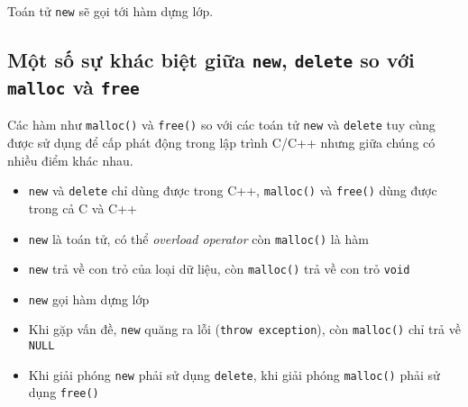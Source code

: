 \documentclass{article}
\begin{document}
Toán tử \texttt{new} sẽ gọi tới hàm dựng lớp.

\subsection{Một số sự khác biệt giữa \texttt{new}, \texttt{delete} so với \texttt{malloc} và \texttt{free}}

Các hàm như \texttt{malloc()} và \texttt{free()} so với các toán tử \texttt{new} và \texttt{delete} tuy cùng được sử dụng để cấp phát động trong lập trình C/C++ nhưng giữa chúng có nhiều điểm khác nhau.

\begin{itemize}
\item \texttt{new} và \texttt{delete} chỉ dùng được trong C++, \texttt{malloc()} và \texttt{free()} dùng được trong cả C và C++
\item \texttt{new} là toán tử, có thể \emph{overload operator} còn \texttt{malloc()} là hàm
\item \texttt{new} trả về con trỏ của loại dữ liệu, còn \texttt{malloc()} trả về con trỏ \texttt{void}
\item \texttt{new} gọi hàm dựng lớp
\item Khi gặp vấn đề, \texttt{new} quăng ra lỗi (\texttt{throw exception}), còn \texttt{malloc()} chỉ trả về \texttt{NULL}
\item Khi giải phóng \texttt{new} phải sử dụng \texttt{delete}, khi giải phóng \texttt{malloc()} phải sử dụng \texttt{free()}

\end{itemize}
\end{document}
